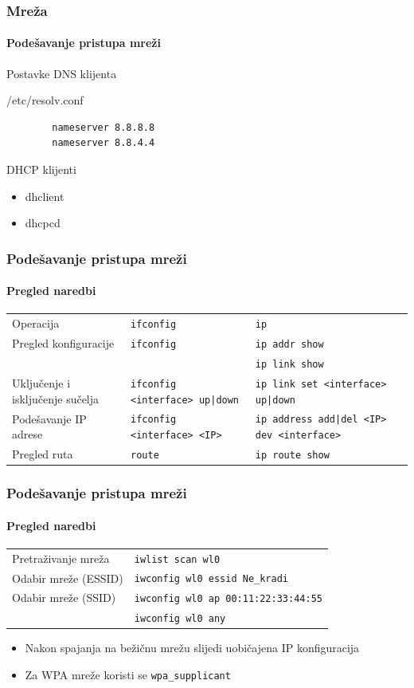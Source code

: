 \documentclass[table,usenames,dvipsnames]{beamer}
\newcommand{\shell}[1]{\texttt{#1}}
\begin{document}
\begin{frame}[fragile]
	\frametitle{Mreža}
	\framesubtitle{Podešavanje pristupa mreži}
	
	Postavke DNS klijenta
	\begin{block}{/etc/resolv.conf}
		\ttfamily
		\begin{verbatim}
		nameserver 8.8.8.8
		nameserver 8.8.4.4
		\end{verbatim}
	\end{block}
	
	\vfill
	
	DHCP klijenti
	\begin{itemize}
		\item dhclient
		\item dhcpcd
	\end{itemize}
\end{frame}

\begin{frame}[t]
	\frametitle{Podešavanje pristupa mreži}
	\framesubtitle{Pregled naredbi}
	\begin{table}[h]
		\begin{tabular}{p{4cm} p{3cm} p{3cm}}
			\rowcolor{BlueViolet!20}Operacija & \shell{ifconfig} & \shell{ip} \\
			Pregled konfiguracije & \shell{ifconfig} & \shell{ip addr show} \\ & & \shell{ip link show} \\
			Uključenje i isključenje sučelja & \shell{ifconfig <interface> up|down} & \shell{ip link set <interface> up|down} \\
			Podešavanje IP adrese & \shell{ifconfig <interface> <IP>} & \shell{ip address add|del <IP> dev <interface>} \\
			Pregled ruta & \shell{route} & \shell{ip route show}
		\end{tabular}
	\end{table}
\end{frame}

\begin{frame}[t]
	\frametitle{Podešavanje pristupa mreži}
	\framesubtitle{Pregled naredbi}
	\begin{table}[h]
		\begin{tabular}{l l}
			Pretraživanje mreža & \shell{iwlist scan wl0}\\
			Odabir mreže (ESSID) & \shell{iwconfig wl0 essid Ne\_kradi}\\
			Odabir mreže (SSID) & \shell{iwconfig wl0 ap 00:11:22:33:44:55}\\
			& \shell{iwconfig wl0 any}\\
		\end{tabular}
	\end{table}
	
	\begin{itemize}
		\item Nakon spajanja na bežičnu mrežu slijedi uobičajena IP konfiguracija
		\item Za WPA mreže koristi se \shell{wpa\_supplicant}
	\end{itemize}
\end{frame}
\end{document}
